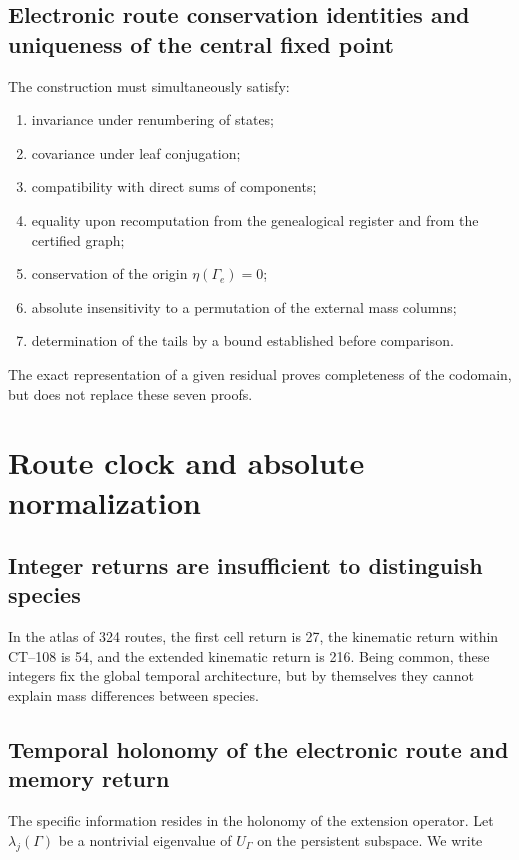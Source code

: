 \subsection{Electronic route conservation identities and uniqueness of the central fixed point}
The construction must simultaneously satisfy:

\begin{enumerate}
\item invariance under renumbering of states;
\item covariance under leaf conjugation;
\item compatibility with direct sums of components;
\item equality upon recomputation from the genealogical register and from the certified graph;
\item conservation of the origin \(\eta(\Gamma_e)=0\);
\item absolute insensitivity to a permutation of the external mass columns;
\item determination of the tails by a bound established before comparison.
\end{enumerate}
The exact representation of a given residual proves completeness of the codomain, but does not replace these seven proofs.

\section{Route clock and absolute normalization}
\subsection{Integer returns are insufficient to distinguish species}
In the atlas of 324 routes, the first cell return is 27, the kinematic return within CT--108 is 54, and the extended kinematic return is 216. Being common, these integers fix the global temporal architecture, but by themselves they cannot explain mass differences between species.

\subsection{Temporal holonomy of the electronic route and memory return}
The specific information resides in the holonomy of the extension operator. Let \(\lambda_j(\Gamma)\) be a nontrivial eigenvalue of \(U_\Gamma\) on the persistent subspace. We write

